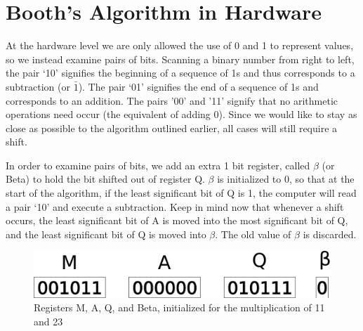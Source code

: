 \documentclass{article}
\begin{document}


\section{Booth's Algorithm in Hardware}
    At the hardware level we are only allowed the use of 0 and 1 to represent values, so we instead examine pairs of bits.
Scanning a binary number from right to left, the pair `10' signifies the beginning of a sequence of 1s and thus corresponds to a subtraction (or $\bar{1}$).
The pair `01' signifies the end of a sequence of 1s and corresponds to an addition.
The pairs '00' and '11' signify that no arithmetic operations need occur (the equivalent of adding 0).
Since we would like to stay as close as possible to the algorithm outlined earlier, all cases will still require a shift.

    In order to examine pairs of bits, we add an extra 1 bit register, called $\beta$ (or Beta) to hold the bit shifted out of register Q.
$\beta$ is initialized to 0, so that at the start of the algorithm, if the least significant bit of Q is 1, the computer will read a pair `10' and execute a subtraction.
Keep in mind now that whenever a shift occurs, the least significant bit of A is moved into the most significant bit of Q, and the least significant bit of Q is moved into $\beta$.
The old value of $\beta$ is discarded.

\begin{figure}[h]
\centering
\includegraphics[scale=0.4]{init2.pdf}
\caption{Registers M, A, Q, and Beta, initialized for the multiplication of 11 and 23}
\end{figure}%

\pagebreak
\end{document}
